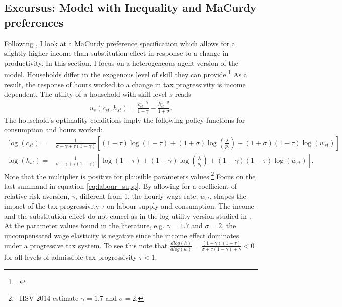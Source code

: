 \subsection{Excursus: Model with Inequality and MaCurdy preferences}
Following \cite{Boppart2019LaborPerspectiveb}, I look at a MaCurdy preference specification which allows for a slightly higher income than substitution effect in response to a change in productivity. In this section, I focus on a heterogeneous agent version of the model. Households differ in the exogenous level of skill they can provide.\footnote{\  } As a result, the response of hours worked to a change in tax progressivity is income dependent. 
The utility of a household with skill level $s$ reads
\begin{align}
	u_s(c_{st},h_{st})=
	\frac{c_{st}^{1-\gamma}}{1-\gamma}-
	\frac{h_{st}^{1+\sigma}}{1+\sigma}.%
\end{align}
The household's optimality conditions imply the following policy functions for consumption and hours worked:
\begin{align}
	\log(c_{st})=& \frac{1}{\sigma +\gamma +\tau(1-\gamma)}\left[(1-\tau)\log(1-\tau)+(1+\sigma)\log\left(\frac{\lambda}{p_{t}}\right)+(1+\sigma)(1-\tau)\log(w_{st})\right]\\
		\log(h_{st})=& \frac{1}{\sigma+\gamma+\tau(1-\gamma)}\left[\log(1-\tau)+(1-\gamma)\log\left(\frac{\lambda}{p_{t}}\right)+(1-\gamma)(1-\tau)\log(w_{st})\right]\label{eq:labour_supp}.
\end{align}
Note that the multiplier is positive for plausible parameters values.\footnote{\ HSV 2014 estimate $\gamma= 1.7$ and $\sigma=2$.} %
Focus on the last summand in equation \ref{eq:labour_supp}.
By allowing for a coefficient of relative risk aversion, $\gamma$, different from 1, the hourly wage rate, $w_{st}$, shapes the impact of the tax progressivity $\tau$ on labour supply and consumption. The income and the substitution effect do not cancel as in the log-utility version studied in \cite{Heathcote2017OptimalFramework}. 
 At the parameter values found in the literature, e.g. $\gamma= 1.7$ and $\sigma=2$, the uncompensated wage elasticity is negative since the income effect dominates under a progressive tax system.  To see this note that  $\frac{d log(h)}{d log(w)}= \frac{(1-\gamma)(1-\tau)}{\sigma+\tau(1-\gamma)+\gamma}<0$ for all levels of admissible tax progressivity $\tau<1$.  
